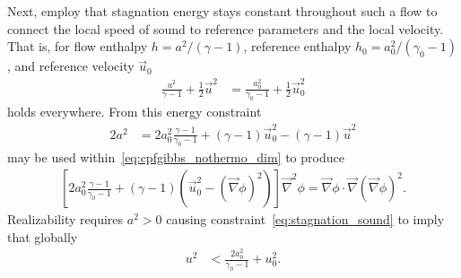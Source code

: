 \documentclass[letterpaper,11pt,nointlimits,reqno]{amsart}
\begin{document}
Next, \citeauthor{Saad2011Coordinate} employ that stagnation energy stays
constant throughout such a flow to connect the local speed of sound to
reference parameters and the local velocity.  That is, for flow enthalpy $h =
a^2 / \left(\gamma-1\right)$, reference enthalpy $h_0 = a_0^2 /
\left(\gamma_0-1\right)$, and reference velocity $\vec{u}_0$
\begin{align}
        \frac{a^2  }{\gamma  -1} + \frac{1}{2} \vec{u}^2
     &= \frac{a_0^2}{\gamma_0-1} + \frac{1}{2} \vec{u}_0^2
\end{align}
holds everywhere. From this energy constraint
\begin{align}
        2a^2
     &=   2a_0^2 \frac{\gamma-1}{\gamma_0-1}
        + \left(\gamma-1\right)\vec{u}_0^2
        - \left(\gamma-1\right)\vec{u}^2
\label{eq:stagnation_sound}
\end{align}
may be used within~\eqref{eq:cpfgibbs_nothermo_dim} to produce
\begin{align}
    \left[
          2a_0^2 \frac{\gamma-1}{\gamma_0-1}
        + \left(\gamma-1\right)
          \left(\vec{u}_0^2 - \left(\vec{\nabla}\phi\right)^2\right)
    \right] \vec{\nabla}^2\phi
     = \vec{\nabla}\phi\cdot \vec{\nabla}\left(\vec{\nabla}\phi\right)^2
\label{eq:cpfgibbs_dim}
.
\end{align}
Realizability requires $a^2>0$ causing constraint~\eqref{eq:stagnation_sound}
to imply that globally
\begin{align}
  u^2 &< \frac{2 a_0^2}{\gamma_0 - 1} + u_0^2
\label{eq:stagnation_sound_realizability}
.
\end{align}
\end{document}
